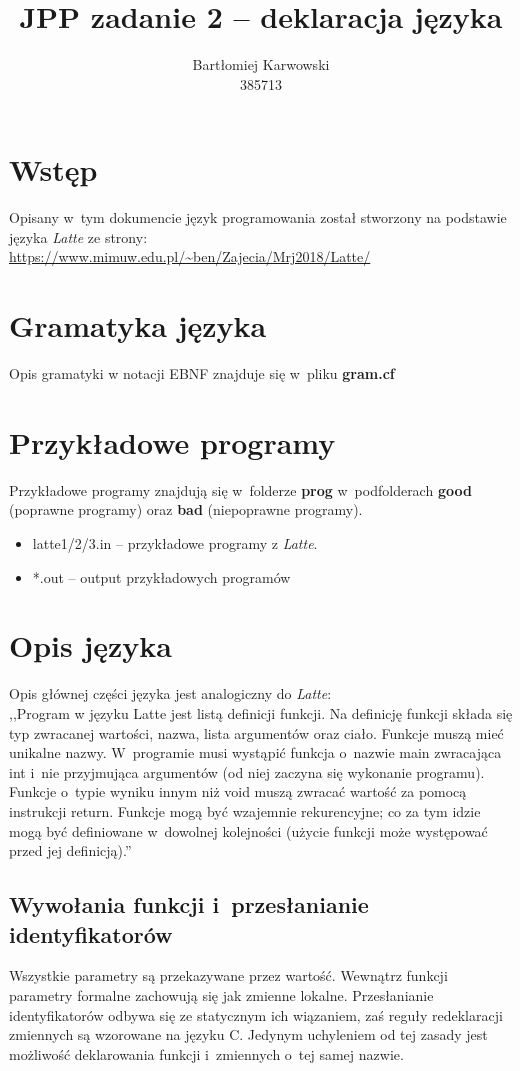 \documentclass{article}
\title{JPP zadanie 2 -- deklaracja języka}
\author{Bartłomiej Karwowski\\385713}
\date{}
\begin{document}
\maketitle

\section{Wstęp}
Opisany w~tym dokumencie język programowania został stworzony 
na podstawie języka \textit{Latte} ze strony:\\

\url{https://www.mimuw.edu.pl/~ben/Zajecia/Mrj2018/Latte/}

\section{Gramatyka języka}
Opis gramatyki w notacji EBNF znajduje się w~pliku \textbf{gram.cf}

\section{Przykładowe programy}
Przykładowe programy znajdują się w~folderze \textbf{prog} w~podfolderach 
\textbf{good} (poprawne programy) oraz \textbf{bad} (niepoprawne programy).
\begin{itemize}
    \item latte1/2/3.in -- przykładowe programy z \textit{Latte}.
    \item *.out -- output przykładowych programów
\end{itemize}

\newpage
\section{Opis języka}
Opis głównej części języka jest analogiczny do \textit{Latte}: \\
,,Program w języku Latte jest listą definicji funkcji. 
Na definicję funkcji składa się typ zwracanej wartości, nazwa, lista argumentów oraz ciało. 
Funkcje muszą mieć unikalne nazwy. 
W~programie musi wystąpić funkcja o~nazwie main zwracająca int 
i~nie przyjmująca argumentów (od niej zaczyna się wykonanie programu).
Funkcje o~typie wyniku innym niż void muszą zwracać wartość za pomocą instrukcji return. Funkcje mogą być wzajemnie rekurencyjne; co za tym idzie mogą być definiowane w~dowolnej kolejności (użycie funkcji może występować przed jej definicją).''

\subsection{Wywołania funkcji i~przesłanianie identyfikatorów}
Wszystkie parametry są przekazywane przez wartość. 
Wewnątrz funkcji parametry formalne zachowują się jak zmienne lokalne.
Przesłanianie identyfikatorów odbywa się ze statycznym ich wiązaniem,
zaś reguły redeklaracji zmiennych są wzorowane na języku C.
Jedynym uchyleniem od tej zasady jest możliwość deklarowania funkcji i~zmiennych o~tej samej nazwie.
\end{document}
